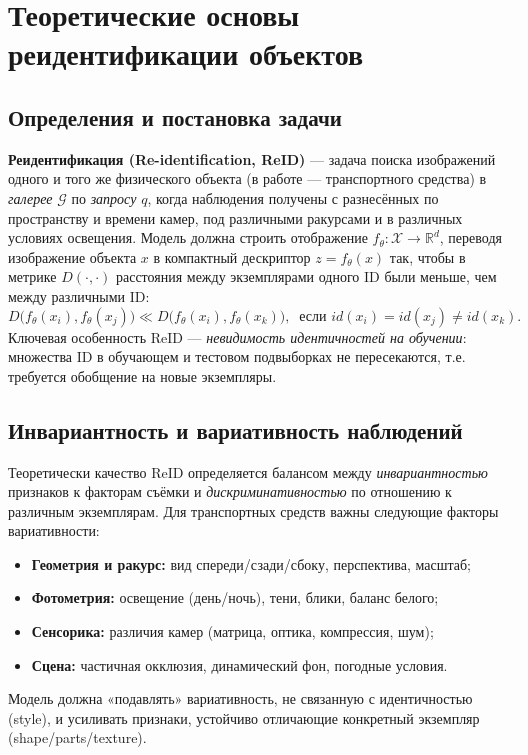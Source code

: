 {\huge\chapter{Теоретические основы реидентификации объектов}}
\label{sec:Theory} 

\section{Определения и постановка задачи}
\textbf{Реидентификация (Re-identification, ReID)} — задача поиска изображений одного и того же физического объекта (в работе — транспортного средства) в \emph{галерее} \(\mathcal{G}\) по \emph{запросу} \(q\), когда наблюдения получены с разнесённых по пространству и времени камер, под различными ракурсами и в различных условиях освещения. Модель должна строить отображение \(f_\theta: \mathcal{X}\!\to\!\mathbb{R}^d\), переводя изображение объекта \(x\) в компактный дескриптор \(z=f_\theta(x)\) так, чтобы в метрике \(D(\cdot,\cdot)\) расстояния между экземплярами одного ID были меньше, чем между различными ID:
\begin{equation}
D\big(f_\theta(x_i), f_\theta(x_j)\big) \ll D\big(f_\theta(x_i), f_\theta(x_k)\big),\;\; \text{если } id(x_i)=id(x_j)\neq id(x_k).
\end{equation}
Ключевая особенность ReID — \emph{невидимость идентичностей на обучении}: множества ID в обучающем и тестовом подвыборках не пересекаются, т.е. требуется обобщение на новые экземпляры.

\section{Инвариантность и вариативность наблюдений}
Теоретически качество ReID определяется балансом между \emph{инвариантностью} признаков к факторам съёмки и \emph{дискриминативностью} по отношению к различным экземплярам. Для транспортных средств важны следующие факторы вариативности:
\begin{itemize}
  \item \textbf{Геометрия и ракурс:} вид спереди/сзади/сбоку, перспектива, масштаб;
  \item \textbf{Фотометрия:} освещение (день/ночь), тени, блики, баланс белого;
  \item \textbf{Сенсорика:} различия камер (матрица, оптика, компрессия, шум);
  \item \textbf{Сцена:} частичная окклюзия, динамический фон, погодные условия.
\end{itemize}
Модель должна «подавлять» вариативность, не связанную с идентичностью (style), и усиливать признаки, устойчиво отличающие конкретный экземпляр (shape/parts/texture).


